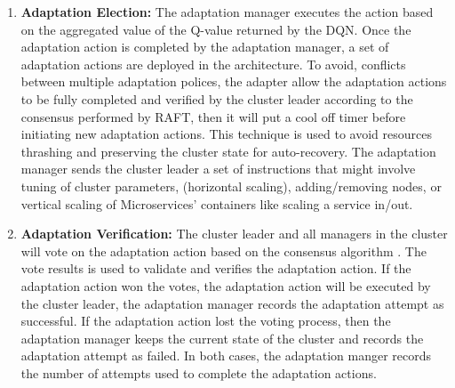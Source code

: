 \documentclass{ieeeaccess}
\begin{document}
\begin{enumerate}
\item \textbf{Adaptation Election:} The adaptation manager executes the action based on the aggregated value of the Q-value returned by the DQN. Once the adaptation action is completed by the adaptation manager, a set of adaptation actions are deployed in the architecture. To avoid, conflicts between multiple adaptation polices, the adapter allow the adaptation actions to be fully completed and verified by the cluster leader according to the consensus performed by RAFT, then it will put a cool off timer before initiating new adaptation actions. This technique is used to avoid resources thrashing and preserving the cluster state for auto-recovery. The adaptation manager sends the cluster leader a set of instructions that might involve tuning of cluster parameters, (horizontal scaling), adding/removing nodes, or vertical scaling of Microservices' containers like scaling a service in/out. 
\item \textbf{Adaptation Verification:} The cluster leader and all managers in the cluster will vote on the adaptation action based on the consensus algorithm \cite{ongaro2015raft}. The vote results is used to validate and verifies the adaptation action. If the adaptation action won the votes, the adaptation action will be executed by the cluster leader, the adaptation manager records the adaptation attempt as successful. If the adaptation action lost the voting process, then the adaptation manager keeps the current state of the cluster and records the adaptation attempt as failed. In both cases, the adaptation manger records the number of attempts used to complete the adaptation actions.  
\end{enumerate}

 
\end{document}
